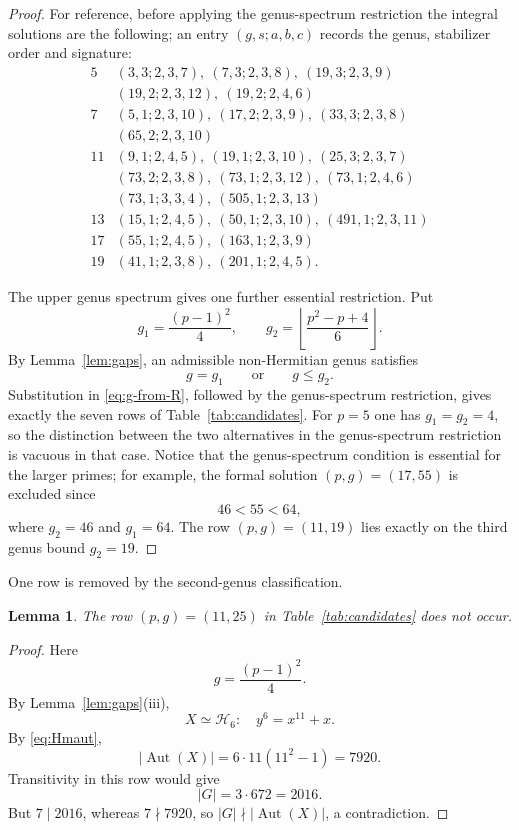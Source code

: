 \documentclass[11pt]{amsart}
\newtheorem{lemma}[theorem]{Lemma}
\theoremstyle{remark}
\newcommand{\Aut}{\operatorname{Aut}}
\newcommand{\cH}{\mathcal H}
\begin{document}
\begin{proof}
For reference, before applying the genus-spectrum restriction the
integral solutions are the following; an entry $(g,s;a,b,c)$ records the
genus, stabilizer order and signature:
\[
\begin{array}{c|l}
5  &(3,3;2,3,7),\ (7,3;2,3,8),\ (19,3;2,3,9)\\
   &(19,2;2,3,12),\ (19,2;2,4,6)\\[1mm]
7  &(5,1;2,3,10),\ (17,2;2,3,9),\ (33,3;2,3,8)\\
   &(65,2;2,3,10)\\[1mm]
11 &(9,1;2,4,5),\ (19,1;2,3,10),\ (25,3;2,3,7)\\
   &(73,2;2,3,8),\ (73,1;2,3,12),\ (73,1;2,4,6)\\
   &(73,1;3,3,4),\ (505,1;2,3,13)\\[1mm]
13 &(15,1;2,4,5),\ (50,1;2,3,10),\ (491,1;2,3,11)\\
17 &(55,1;2,4,5),\ (163,1;2,3,9)\\
19 &(41,1;2,3,8),\ (201,1;2,4,5).
\end{array}
\]

The upper genus spectrum gives one further essential restriction. Put
\[
g_1=\frac{(p-1)^2}{4},
\qquad
g_2=\left\lfloor\frac{p^2-p+4}{6}\right\rfloor.
\]
By Lemma~\ref{lem:gaps}, an admissible non-Hermitian genus satisfies
\[
g=g_1\qquad\text{or}\qquad g\le g_2.
\]
Substitution in \eqref{eq:g-from-R}, followed by the genus-spectrum
restriction, gives exactly the seven rows of Table~\ref{tab:candidates}.
For $p=5$ one has $g_1=g_2=4$, so the distinction between the two
alternatives in the genus-spectrum restriction is vacuous in that
case. Notice that the genus-spectrum condition is essential for the
larger primes; for example, the formal solution
$(p,g)=(17,55)$ is excluded since
\[
46<55<64,
\]
where $g_2=46$ and $g_1=64$. The row $(p,g)=(11,19)$ lies exactly on
the third genus bound $g_2=19$.
\end{proof}

One row is removed by the second-genus classification.

\begin{lemma}\label{lem:gapeliminate}
The row $(p,g)=(11,25)$ in Table~\ref{tab:candidates} does not occur.
\end{lemma}

\begin{proof}
Here
\[
g=\frac{(p-1)^2}{4}.
\]
By Lemma~\ref{lem:gaps}(iii),
\[
X\simeq \cH_6:\quad y^6=x^{11}+x.
\]
By \eqref{eq:Hmaut},
\[
|\Aut(X)|=6\cdot11(11^2-1)=7920.
\]
Transitivity in this row would give
\[
|G|=3\cdot672=2016.
\]
But $7\mid2016$, whereas $7\nmid7920$, so
$|G|\nmid|\Aut(X)|$, a contradiction.
\end{proof}
\end{document}
